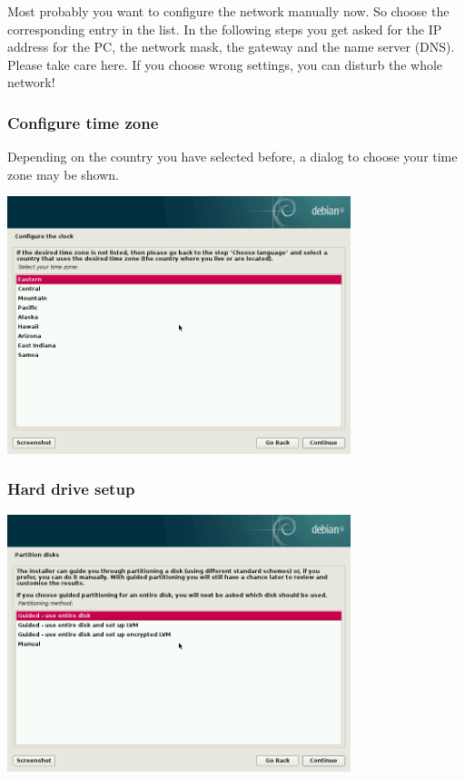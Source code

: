 \documentclass[a4paper,12pt,twoside]{article}
\begin{document}
Most probably you want to configure the network manually now. So choose
the corresponding entry in the list. In the following steps you get
asked for the IP address for the PC, the network mask, the gateway and
the name server (DNS). Please take care here. If you choose wrong
settings, you can disturb the whole network!


\subsubsection{Configure time zone}
\label{sct:inst_timezone}

Depending on the country you have selected before, a dialog to choose
your time zone may be shown.

\bigskip
\begin{minipage}{\linewidth}
    \centering
    \captionsetup{type=figure}
    \includegraphics[width=10cm]{screenshots/select_timezone.png}
    \label{fig:inst_timezone}
\end{minipage}


\subsubsection{Hard drive setup}
\label{sct:inst_harddrive}

\begin{minipage}{\linewidth}
    \centering
    \captionsetup{type=figure}
    \includegraphics[width=10cm]{screenshots/select_partitioning.png}
    \label{fig:partitioning}
\end{minipage}
\bigskip
\end{document}
